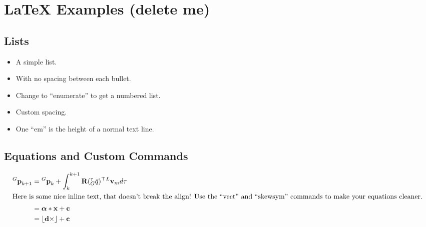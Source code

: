 \section{\LaTeX{} Examples (delete me)} \label{sec:examples}


\subsection{Lists}

\begin{itemize}[noitemsep,nolistsep]
    \item A simple list.
    \item With no spacing between each bullet.
    \item Change to ``enumerate'' to get a numbered list.
\end{itemize}

\begin{itemize}[itemsep=0.25em]
    \item Custom spacing.
    \item One ``em'' is the height of a normal text line.
\end{itemize}





\subsection{Equations and Custom Commands}

\begin{align}
    {}^{G}\vect{p}_{k+1}
    &= {}^{G}\vect{p}_{k} +
    \int_{k}^{k+1}
    \vect{R}({}^{\tau}_G\bar{q})^\top{}^L\vect{v}_m
    d\tau \\
%
\intertext{%
Here is some nice inline text, that doesn't break the align!
Use the ``vect'' and ``skewsym'' commands to make your equations cleaner.
}
%
    &= \vect{\alpha}*\vect{x} + \vect{c} \\
    &= \skewsym{\vect{d}} + \vect{c}
    \label{eq:equationnamehere1}
\end{align}


